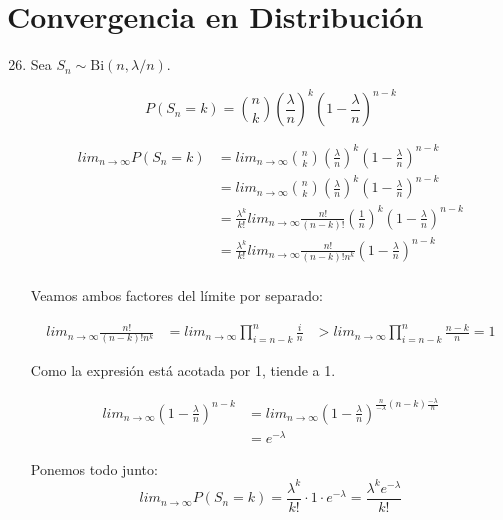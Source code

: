 \section{Convergencia en Distribución}
\begin{enumerate}
	\setcounter{enumi}{25}
	\item
		Sea $S_n \sim \text{Bi}(n,\lambda /n)$.
		
		$$P(S_n = k) = \binom{n}{k} \left( \frac{\lambda}{n}\right) ^k \left(1- \frac{\lambda}{n}\right) ^{n-k}$$
		
		\begin{align*}
			lim_{n\rightarrow \infty} P(S_n = k) & = lim_{n\rightarrow \infty} \binom{n}{k} \left( \frac{\lambda}{n}\right) ^k \left(1- \frac{\lambda}{n}\right) ^{n-k} \\
			                                     & = lim_{n\rightarrow \infty} \binom{n}{k} \left( \frac{\lambda}{n}\right) ^k \left(1- \frac{\lambda}{n}\right) ^{n-k} \\
			                                     & = \frac{\lambda^k}{k!} lim_{n\rightarrow \infty} \frac{n!}{(n-k)!} \left( \frac{1}{n}\right) ^k \left(1- \frac{\lambda}{n}\right) ^{n-k} \\
			                                     & = \frac{\lambda^k}{k!} lim_{n\rightarrow \infty} \frac{n!}{(n-k)!n^k} \left(1- \frac{\lambda}{n}\right) ^{n-k} \\
		\end{align*}
		
		Veamos ambos factores del límite por separado:
		
		\begin{align*}
			lim_{n\rightarrow \infty} \frac{n!}{(n-k)!n^k} & = lim_{n\rightarrow \infty} \prod_{i=n-k}^n \frac{i}{n}
			                                               & > lim_{n\rightarrow \infty} \prod_{i=n-k}^n \frac{n-k}{n} = 1
		\end{align*}
		
		Como la expresión está acotada por 1, tiende a 1.
		
		\begin{align*}
			lim_{n\rightarrow \infty} \left(1- \frac{\lambda}{n}\right) ^{n-k} & = lim_{n\rightarrow \infty} \left(1- \frac{\lambda}{n}\right) ^{\frac{n}{-\lambda}(n-k)\frac{-\lambda}{n}} \\
			                                                                   & = e^{-\lambda}
		\end{align*}
		
		Ponemos todo junto:
		$$lim_{n\rightarrow \infty} P(S_n = k) = \frac{\lambda^k}{k!} \cdot 1 \cdot e^{-\lambda} = \frac{\lambda^k e^{-\lambda}}{k!}$$
		

\end{enumerate}
